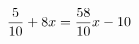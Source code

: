 \documentclass[preview]{standalone}
\begin{document}
\begin{align*}
\special{dvisvgm:raw <g id='unique000'>}\frac{5}{10} + 8x = \frac{58}{10}x - 10\special{dvisvgm:raw </g>}
\end{align*}
\end{document}
